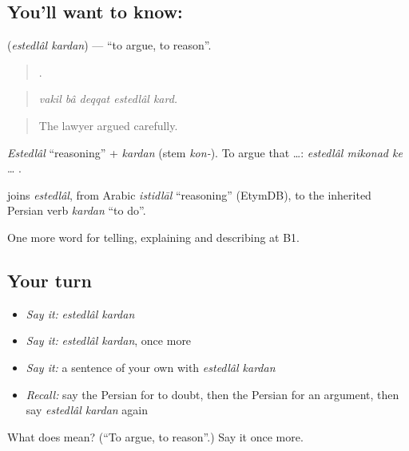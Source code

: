 \subsection*{You'll want to know:  }
\textbf{ } (\emph{estedlâl kardan}) — \textquotedblleft{}to argue, to reason\textquotedblright{}.

\begin{quote}
    .
\end{quote}

\begin{quote}
\emph{vakil bâ deqqat estedlâl kard.}
\end{quote}

\begin{quote}
The lawyer argued carefully.
\end{quote}

\emph{Estedlâl} \textquotedblleft{}reasoning\textquotedblright{} + \emph{kardan} (stem \emph{kon-}). To argue that …: \emph{estedlâl mikonad ke} … .

\begin{cousinweb}
\textbf{ } joins \emph{estedlâl}, from Arabic \emph{istidlāl} \textquotedblleft{}reasoning\textquotedblright{} (EtymDB), to the inherited Persian verb \emph{kardan} \textquotedblleft{}to do\textquotedblright{}.
\end{cousinweb}

\begin{grammarlens}[title={What you've built}]
One more word for telling, explaining and describing at B1.
\end{grammarlens}

\subsection*{Your turn}
\begin{itemize}
\raggedright
  \item \emph{Say it:} \emph{estedlâl kardan}
  \item \emph{Say it:} \emph{estedlâl kardan}, once more
  \item \emph{Say it:} a sentence of your own with \emph{estedlâl kardan}
  \item \emph{Recall:} say the Persian for to doubt, then the Persian for an argument, then say \emph{estedlâl kardan} again
\end{itemize}

\begin{tcolorbox}[breakable,colback=teal!4,colframe=teal!35!black,title={Before you move on}]
What does   mean? (\textquotedblleft{}To argue, to reason\textquotedblright{}.) Say it once more.
\end{tcolorbox}
